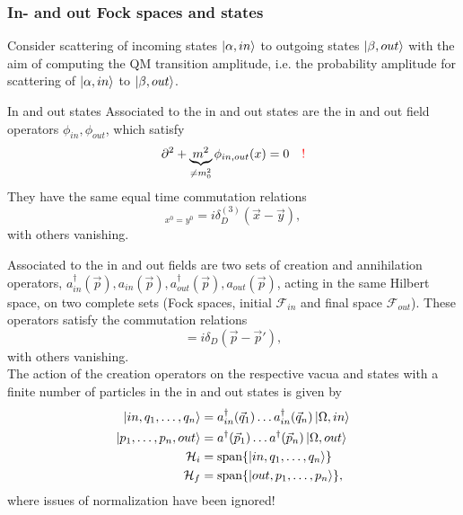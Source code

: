 \subsubsection{In- and out Fock spaces and states}
Consider scattering of incoming states $\ket{\alpha,in}$ to outgoing states $\ket{\beta,out}$ with the aim of computing the QM transition amplitude, i.e. the probability amplitude for scattering of $\ket{\alpha,in}$ to $\ket{\beta,out}$.
\begin{mybox}{In and out states}
	Associated to the in and out states are the in and out field operators $\phi_{in}, \phi_{out}$, which satisfy
	\begin{equation}
		\partial^2+\underbrace{m^2}_{\neq m^2_0}  \phi_{in, out} (x) = 0 \quad \textcolor{red}{!}
	\end{equation}
	They have the same equal time commutation relations
	\begin{equation}
		[\phi_{in, out}(x),\Pi_{in,out} (y)]_{x^0=y^0} = i \delta^{(3)}_D (\vec{x}-\vec{y}),
	\end{equation}
	with others vanishing.
\end{mybox}
Associated to the in and out fields are two sets of creation and annihilation operators, $a^{\dagger}_{in}(\vec{p}), a_{in}(\vec{p}), a^{\dagger}_{out}(\vec{p}),a_{out}(\vec{p})$, acting in the same Hilbert space, on two complete sets (Fock spaces, initial $\mathcal{F}_{in}$ and final space $\mathcal{F}_{out}$). These operators satisfy the commutation relations
\begin{equation}
	[a_{in,out}(\vec{p}) , a^{\dagger}_{in,out} (\vec{p})]= i \delta_D(\vec{p}-\vec{p}'),
\end{equation}
with others vanishing.\\
The action of the creation operators on the respective vacua and states with a finite number of particles in the in and out states is given by
\begin{align}
	\ket{in, q_1, \dots,q_n} &=a^{\dagger}_{in}(\vec{q}_1) \dots a^{\dagger}_{in} (\vec{q}_n) \ket{\Omega,in}\\
	\ket{p_1,\dots, p_n, out} &= a^{\dagger}(\vec{p}_1) \dots a^{\dagger}(\vec{p}_n) \ket{\Omega,out}\\
	\mathcal{H}_i &= \mathrm{span}\{\ket{in, q_1,\dots, q_n}\}\\
	\mathcal{H}_f &= \mathrm{span}\{\ket{out,p_1,\dots,p_n}\},
\end{align}
where issues of normalization have been ignored!

